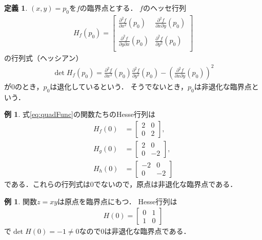 \documentclass[11pt, a4paper, dvipdfmx]{jsarticle}
\theoremstyle{definition}
\newcommand{\p}{\partial}
\newcommand{\dip}{\displaystyle} %
\theoremstyle{mystyle}
\newtheorem{DFN}[Axiom]{定義}
\newtheorem{EG}[Axiom]{例}
\numberwithin{equation}{section} %
\begin{document}
\begin{DFN}
    $(x,y)=p_0$を$f$の臨界点とする．
    $f$のヘッセ行列
    \begin{align}
        H_f(p_0)=
        \begin{bmatrix*}
            \dip \frac{\p^2 f}{\p x^2}(p_0)   &\dip\frac{\p^2 f}{\p x\p y}(p_0)\\\\
            \dip \frac{\p^2 f}{\p y\p x}(p_0) &\dip \frac{\p^2 f}{\p y^2}(p_0)\\
        \end{bmatrix*}
    \end{align}
    の行列式（ヘッシアン）
    \begin{align}
        \det H_f(p_0) = \frac{\p^2 f}{\p x^2}(p_0)\dip \frac{\p^2 f}{\p y^2}(p_0)
        -\left(\frac{\p^2 f}{\p x\p y}(p_0)\right)^2 \label{eq:hessian}
    \end{align}
    が0のとき，$p_0$は退化しているという．
    そうでないとき，$p_0$は非退化な臨界点という．
\end{DFN}

\begin{EG}
    式\eqref{eq:quadFunc}の関数たちのHesse行列は
    \begin{align*}
        H_f(0)&=
        \begin{bmatrix*}
            \dip 2&0\\
            \dip 0&2
        \end{bmatrix*},\\
        H_g(0)&=
        \begin{bmatrix*}
            \dip 2 & 0\\
            \dip 0 &-2
        \end{bmatrix*},\\
        H_h(0)&=
        \begin{bmatrix*}
            \dip -2& 0\\
            \dip 0 &-2
        \end{bmatrix*}
    \end{align*}
    である．これらの行列式は0でないので，原点は非退化な臨界点である．
\end{EG}

\begin{EG}\label{eg:n-deg}
    関数$z=xy$は原点を臨界点にもつ．
    Hesse行列は
    \begin{align*}
        H(0)=\begin{bmatrix*}
            0&1\\
            1&0
        \end{bmatrix*}
    \end{align*}
    で$\det H(0)=-1\neq0$なので0は非退化な臨界点である．
\end{EG}
\end{document}
